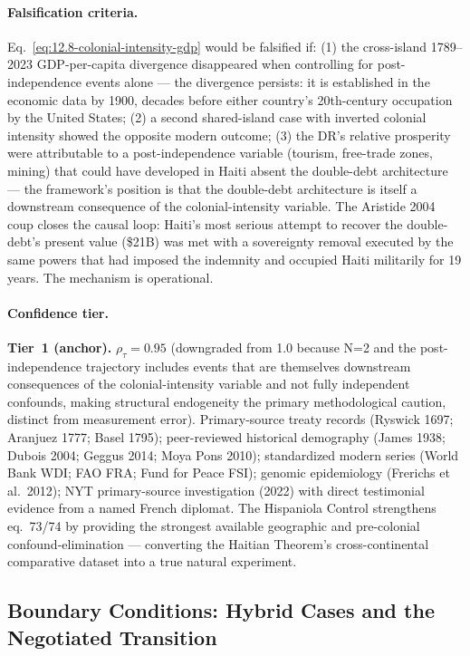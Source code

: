 \paragraph{Falsification criteria.}
Eq.~\ref{eq:12.8-colonial-intensity-gdp} would be falsified if: (1) the cross-island 1789--2023 GDP-per-capita divergence disappeared when controlling for post-independence events alone --- the divergence persists: it is established in the economic data by 1900, decades before either country's 20th-century occupation by the United States; (2) a second shared-island case with inverted colonial intensity showed the opposite modern outcome; (3) the DR's relative prosperity were attributable to a post-independence variable (tourism, free-trade zones, mining) that could have developed in Haiti absent the double-debt architecture --- the framework's position is that the double-debt architecture is itself a downstream consequence of the colonial-intensity variable. The Aristide 2004 coup closes the causal loop: Haiti's most serious attempt to recover the double-debt's present value (\$21B) was met with a sovereignty removal executed by the same powers that had imposed the indemnity and occupied Haiti militarily for 19 years. The mechanism is operational.

\paragraph{Confidence tier.}
\textbf{Tier~1 (anchor).} $\rho_\tau = 0.95$ (downgraded from 1.0 because N=2 and the post-independence trajectory includes events that are themselves downstream consequences of the colonial-intensity variable and not fully independent confounds, making structural endogeneity the primary methodological caution, distinct from measurement error). Primary-source treaty records (Ryswick 1697; Aranjuez 1777; Basel 1795); peer-reviewed historical demography (James 1938; Dubois 2004; Geggus 2014; Moya Pons 2010); standardized modern series (World Bank WDI; FAO FRA; Fund for Peace FSI); genomic epidemiology (Frerichs et al.\ 2012); NYT primary-source investigation (2022) with direct testimonial evidence from a named French diplomat. The Hispaniola Control strengthens eq.~73/74 by providing the strongest available geographic and pre-colonial confound-elimination --- converting the Haitian Theorem's cross-continental comparative dataset into a true natural experiment.

\subsection{Boundary Conditions: Hybrid Cases and the Negotiated Transition}

